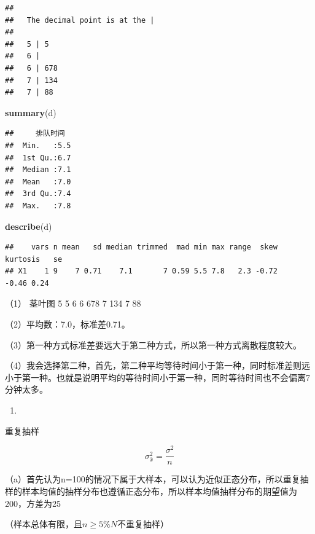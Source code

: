 \documentclass[]{ctexbook}
\newenvironment{Shaded}{\begin{snugshade}}{\end{snugshade}}
\newcommand{\KeywordTok}[1]{\textcolor[rgb]{0.13,0.29,0.53}{\textbf{#1}}}
\newcommand{\NormalTok}[1]{#1}
\begin{document}
\begin{verbatim}
## 
##   The decimal point is at the |
## 
##   5 | 5
##   6 | 
##   6 | 678
##   7 | 134
##   7 | 88
\end{verbatim}

\begin{Shaded}
\begin{Highlighting}[]
\KeywordTok{summary}\NormalTok{(d)}
\end{Highlighting}
\end{Shaded}

\begin{verbatim}
##     排队时间  
##  Min.   :5.5  
##  1st Qu.:6.7  
##  Median :7.1  
##  Mean   :7.0  
##  3rd Qu.:7.4  
##  Max.   :7.8
\end{verbatim}

\begin{Shaded}
\begin{Highlighting}[]
\KeywordTok{describe}\NormalTok{(d)}
\end{Highlighting}
\end{Shaded}

\begin{verbatim}
##    vars n mean   sd median trimmed  mad min max range  skew kurtosis   se
## X1    1 9    7 0.71    7.1       7 0.59 5.5 7.8   2.3 -0.72    -0.46 0.24
\end{verbatim}

（1）
茎叶图
5 \textbar{} 5
6 \textbar{}
6 \textbar{} 678
7 \textbar{} 134
7 \textbar{} 88

（2）平均数：7.0，标准差0.71。

（3）第一种方式标准差要远大于第二种方式，所以第一种方式离散程度较大。

（4）我会选择第二种，首先，第二种平均等待时间小于第一种，同时标准差则远小于第一种。也就是说明平均的等待时间小于第一种，同时等待时间也不会偏离7分钟太多。

\begin{enumerate}
\def\labelenumi{\arabic{enumi}.}
\setcounter{enumi}{4}
\item
\end{enumerate}

重复抽样

\[\sigma_{\bar x}^2=\frac{\sigma^2}{n}\]

（a）首先认为n=100的情况下属于大样本，可以认为近似正态分布，所以重复抽样的样本均值的抽样分布也遵循正态分布，所以样本均值抽样分布的期望值为200，方差为25

（样本总体有限，且\(n\ge 5\%N\)不重复抽样）
\end{document}

